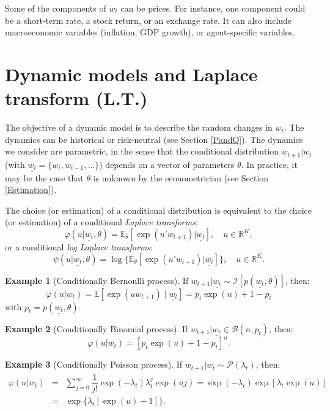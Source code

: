 \documentclass[
  12pt,
]{book}
\theoremstyle{definition}
\theoremstyle{definition}
\newtheorem{example}{Example}[chapter]
\theoremstyle{definition}
\theoremstyle{definition}
\theoremstyle{remark}
\begin{document}
Some of the components of \(w_t\) can be prices. For instance, one component could be a short-term rate, a stock return, or an exchange rate. It can also include macroeconomic variables (inflation, GDP growth), or agent-specific variables.

\hypertarget{Dynamic}{%
\section{Dynamic models and Laplace transform (L.T.)}\label{Dynamic}}

The objective of a dynamic model is to describe the random changes in \(w_t\). The dynamics can be historical or risk-neutral (see Section \ref{PandQ}). The dynamics we consider are parametric, in the sense that the conditional distribution \(w_{t+1}|\underline{w_t}\) (with \(\underline{w_t}=\{w_t,w_{t-1},\dots\}\)) depends on a vector of parameters \(\theta\). In practice, it may be the case that \(\theta\) is unknown by the econometrician (see Section \ref{Estimation}).

The choice (or estimation) of a conditional distribution is equivalent to the choice (or estimation) of a conditional \emph{Laplace transforms}:
\begin{equation}
\varphi(u|\underline{w_t},\theta) =
\mathbb{E}_{\theta}[\exp(u'w_{t+1})|\underline{w_t}], \quad u \in \mathbb{R}^K,\label{eq:LT}
\end{equation}
or a conditional \emph{log Laplace transforms}:
\[
\psi(u|\underline{w_t},\theta) =
\log\{\mathbb{E}_{\theta}[\exp(u'w_{t+1})|\underline{w_t}]\}, \quad u \in
\mathbb{R}^K.
\]

\begin{example}[Conditionally Bernoulli process]
\protect\hypertarget{exm:exBenoulli}{}\label{exm:exBenoulli}If \(w_{t+1}|\underline{w_t} \sim {\mathcal{I}} [p(\underline{w_t},\theta)]\), then:
\[
\varphi(u|w_t)=
\mathbb{E}[\exp(u w_{t+1}) \mid \underline{w_t}] = p_t \exp(u) + 1-p_t
\]
with \(p_t = p(\underline{w_t}, \theta)\).
\end{example}

\begin{example}[Conditionally Binomial process]
\protect\hypertarget{exm:exBenoulli2}{}\label{exm:exBenoulli2}If \(w_{t+1}|\underline{w_t} \in {\mathcal{B}}(n, p_t)\), then:
\[
\varphi(u|w_t)=[p_t   \exp(u) + 1-p_t]^n.
\]
\end{example}

\begin{example}[Conditionally Poisson process]
\protect\hypertarget{exm:exPoisson}{}\label{exm:exPoisson}If \(w_{t+1}|\underline{w_t} \sim {\mathcal{P}}(\lambda_t)\), then:
\begin{eqnarray*}
\varphi(u|w_t) & =&   \sum^\infty_{j=0}  \dfrac{1}{j!}  \exp(-\lambda_t) \lambda^j_t   \exp(uj)  = \exp(-\lambda_t) \exp[\lambda_t \exp(u)] \\
& =& \exp\{\lambda_t[\exp(u)-1]\}.
\end{eqnarray*}
\end{example}
\end{document}
